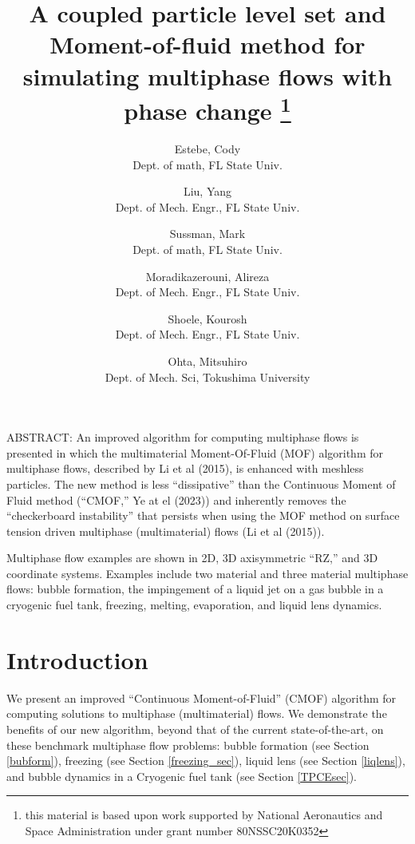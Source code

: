\documentclass[]{article}
\title{A coupled particle level set and Moment-of-fluid method 
  for simulating multiphase flows with phase change
  \thanks{this material is based upon work supported by National
   Aeronautics and Space Administration under grant number
   80NSSC20K0352}}
\author{
  Estebe, Cody \\
  Dept. of math, FL State Univ. 
  \and
  Liu, Yang \\
  Dept. of Mech. Engr., FL State Univ.
  \and
  Sussman, Mark \\
  Dept. of math, FL State Univ. 
  \and
  Moradikazerouni, Alireza \\
  Dept. of Mech. Engr., FL State Univ.
  \and
  Shoele, Kourosh  \\
  Dept. of Mech. Engr., FL State Univ.
  \and
  Ohta, Mitsuhiro \\
  Dept. of Mech. Sci, Tokushima University 
}
\begin{document}
\maketitle

ABSTRACT:
An improved algorithm for computing multiphase flows is presented in 
which the multimaterial Moment-Of-Fluid (MOF) algorithm for multiphase flows, 
described by Li et al (2015), is enhanced with 
meshless particles.  The new method is less ``dissipative'' than the 
Continuous Moment of Fluid method (``CMOF,'' Ye at el (2023)) and inherently 
removes the ``checkerboard instability'' that persists when using the 
MOF method on surface tension driven multiphase (multimaterial) 
flows (Li et al (2015)).

Multiphase flow examples are shown in 2D, 3D axisymmetric ``RZ,'' and 
3D coordinate systems.  Examples include two material and three 
material multiphase flows: bubble formation, the impingement of a 
liquid jet on a gas bubble in a cryogenic fuel tank, freezing, melting,
evaporation, and liquid lens dynamics.
\linenumbers
\section{Introduction}
We present an improved ``Continuous Moment-of-Fluid'' (CMOF) algorithm
for computing solutions to multiphase (multimaterial) flows.  We 
demonstrate the benefits of our new algorithm, beyond that of the 
current state-of-the-art, on these benchmark multiphase flow
problems:
bubble formation\cite{helsby1955behaviour} (see Section \ref{bubform}),
freezing\cite{hu2010icing} (see Section \ref{freezing_sec}), 
liquid lens\cite{MIAO2021109358} (see Section \ref{liqlens}),
and bubble dynamics in a Cryogenic fuel 
tank\cite{bentz1993low} (see Section \ref{TPCEsec}).
\end{document}
